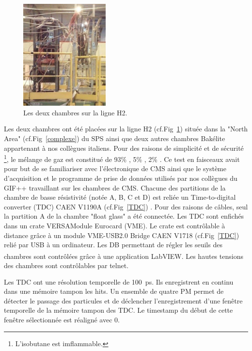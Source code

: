 \begin{figure}
	\centering
	\includegraphics[width=0.40\textwidth]{GLA/GCH2.png}
	\caption{Les deux chambres sur la ligne H2.}
	\label{GCH2}
\end{figure}
Les deux chambres ont été placées sur la ligne H2 (cf.Fig~\ref{GCH2}) située dans la "North Area" (cf.Fig~\ref{complexe}) du SPS ainsi que deux autres chambres Bakélite appartenant à nos collègues italiens. Pour des raisons de simplicité et de sécurité \footnote{L'isobutane est imflammable.}, le mélange de gaz est constitué de 93\% , 5\% , 2\% . Ce test en faisceaux avait pour but de se familiariser avec l'électronique de CMS ainsi que le système d'acquisition et le programme de prise de données utilisés par nos collègues du GIF++ travaillant sur les chambres de CMS. 
Chacune des partitions de la chambre de basse résistivité (notée A, B, C et D) est reliée un Time-to-digital converter (TDC) CAEN V1190A (cf.Fig~\ref{TDC}) \cite{TDC}. Pour des raisons de câbles, seul la partition A de la chambre "float glass" a été connectée. Les TDC sont enfichés dans un crate VERSAModule Eurocard (VME). Le crate est contrôlable à distance grâce à un module VME-USB2.0 Bridge CAEN V1718 (cf.Fig~\ref{TDC}) \cite{VME} relié par USB à un ordinateur. Les DB permettant de régler les seuils des chambres sont contrôlées grâce à une application LabVIEW\textsuperscript{\textregistered}. Les hautes tensions des chambres sont contrôlables par telnet. 

Les TDC ont une résolution temporelle de \SI{100}{\pico\second}. Ils enregistrent en continu dans une mémoire tampon les hits. Un ensemble de quatre PM permet de détecter le passage des particules et de déclencher l'enregistrement d'une fenêtre temporelle de la mémoire tampon des TDC. Le timestamp du début de cette fenêtre sélectionnée est réaligné avec $0$.

